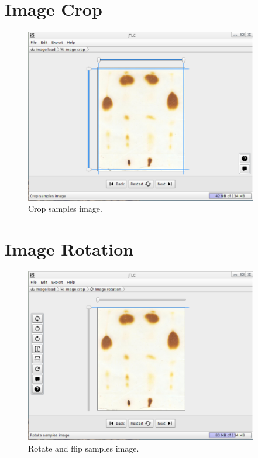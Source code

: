 \section{Image Crop}
\begin{figure}[H]
	\vspace{0cm}
	\centering
	\includegraphics[width=385px]{imagenes/crop}
	\centering
	\vspace{-0.4cm}
	\caption{Crop samples image.}
	\label{fig:image_cut}
	\vspace{-0.25cm}
\end{figure}

\section{Image Rotation}
\begin{figure}[H]
	\vspace{0cm}
	\centering
	\includegraphics[width=385px]{imagenes/rotate}
	\centering
	\vspace{-0.4cm}
	\caption{Rotate and flip samples image.}
	\label{fig:image_rot}
	\vspace{-0.25cm}
\end{figure}

